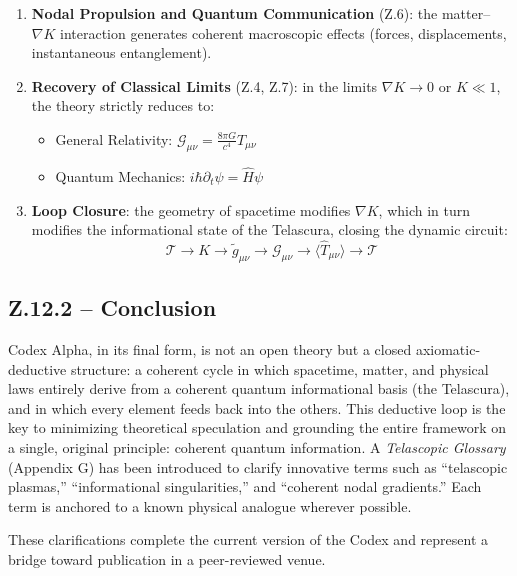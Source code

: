 \documentclass[12pt]{article}
\begin{document}
\begin{enumerate}
    \item \textbf{Nodal Propulsion and Quantum Communication} (Z.6): the matter–\(\nabla K\) interaction generates coherent macroscopic effects (forces, displacements, instantaneous entanglement).

    \item \textbf{Recovery of Classical Limits} (Z.4, Z.7): in the limits \( \nabla K \rightarrow 0 \) or \( K \ll 1 \), the theory strictly reduces to:
    \begin{itemize}
        \item General Relativity: \( \mathcal{G}_{\mu\nu} = \frac{8\pi G}{c^4} T_{\mu\nu} \)
        \item Quantum Mechanics: \( i\hbar \partial_t \psi = \hat{H} \psi \)
    \end{itemize}

    \item \textbf{Loop Closure}: 
    the geometry of spacetime modifies \(\nabla K\), which in turn modifies the informational state of the Telascura, closing the dynamic circuit:
    \[
    \mathcal{T} \longrightarrow K \longrightarrow \tilde{g}_{\mu\nu} \longrightarrow \mathcal{G}_{\mu\nu} \longrightarrow \langle \hat{T}_{\mu\nu} \rangle \longrightarrow \mathcal{T}
    \]
\end{enumerate}

\subsection*{Z.12.2 – Conclusion}

Codex Alpha, in its final form, is not an open theory but a closed axiomatic-deductive structure: a coherent cycle in which spacetime, matter, and physical laws entirely derive from a coherent quantum informational basis (the Telascura), and in which every element feeds back into the others. This deductive loop is the key to minimizing theoretical speculation and grounding the entire framework on a single, original principle: coherent quantum information.
A \textit{Telascopic Glossary} (Appendix G) has been introduced to clarify innovative terms such as “telascopic plasmas,” “informational singularities,” and “coherent nodal gradients.” Each term is anchored to a known physical analogue wherever possible.

\bigskip

These clarifications complete the current version of the Codex and represent a bridge toward publication in a peer-reviewed venue.
\end{document}
